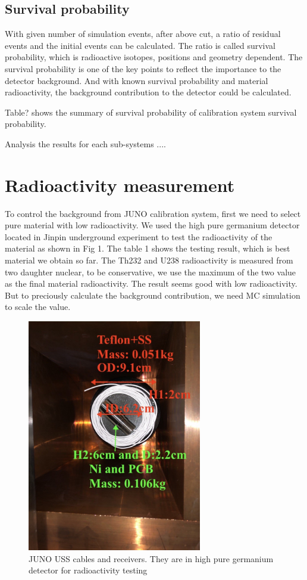 \documentclass[review,number,sort&compress]{elsarticle}
\begin{document}
\subsection{Survival probability}

With given number of simulation events, after above cut, a ratio of residual events and the initial events can be calculated.
The ratio is called survival probability, which is radioactive isotopes, positions and geometry dependent. 
The survival probability is one of the key points to reflect the importance to the detector background.
And with known survival probability and material radioactivity, the background contribution to the detector could be calculated.

Table? shows the summary of survival probability of calibration system survival probability.


Analysis the results for each sub-systems ....

\section{Radioactivity measurement}
To control the background from JUNO calibration system, first we need to select pure material with low radioactivity. 
We used the high pure germanium detector located in Jinpin underground experiment to test the radioactivity of the material as shown in Fig 1.
The table 1 shows the testing result, which is best material we obtain so far. The Th232 and U238 radioactivity is measured from two daughter nuclear, to be conservative, we use the maximum of the two value as the final material radioactivity. The result seems good with low radioactivity. But to preciously calculate the background contribution, we need MC simulation to scale the value.

\begin{figure}[h]
	\centering
	\includegraphics[width=3in]{USS_Cable_PCB_Ni.png}
	\caption{JUNO USS cables and receivers. They are in high pure germanium detector for radioactivity testing}
	\label{USS_Cable_PCB}
\end{figure}
\end{document}
